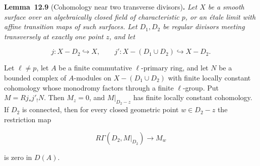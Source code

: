 \documentclass[11pt]{article}
\newenvironment{bpstatement}[2]{\par\addvspace{0.6\baselineskip}\noindent\textbf{#1}#2\textbf{.}\enspace\ignorespaces}
  {\par\addvspace{0.4\baselineskip}}
\newenvironment{bpstatementit}[2]{\begin{bpstatement}{#1}{#2}\itshape\ignorespaces}{\end{bpstatement}}
\begin{document}
\label{bp253}%
\begin{bpstatementit}{Lemma~12.9}{ (Cohomology near two transverse divisors)}
Let \(X\) be a smooth surface over an algebraically closed field of characteristic \(p\), or an étale limit with affine transition maps of such surfaces. Let \(D_1,D_2\) be regular divisors meeting transversely at exactly one point \(z\), and let

\[
j:X-D_2\hookrightarrow X,\qquad
j':X-(D_1\cup D_2)\hookrightarrow X-D_2.
\]

Let \(\ell\ne p\), let \(A\) be a finite commutative \(\ell\)-primary ring, and let \(N\) be a bounded complex of \(A\)-modules on \(X-(D_1\cup D_2)\) with finite locally constant cohomology whose monodromy factors through a finite \(\ell\)-group. Put \(M=Rj_*j'_!N\). Then \(M_z=0\), and \(M|_{D_2-z}\) has finite locally constant cohomology. If \(D_2\) is connected, then for every closed geometric point \(w\in D_2-z\) the restriction map

\[
R\Gamma(D_2,M|_{D_2})\longrightarrow M_w
\]

is zero in \(D(A)\).
\end{bpstatementit}
\end{document}
